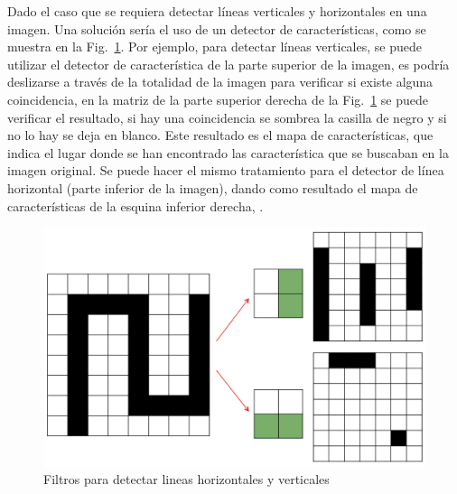    Dado el caso que se requiera detectar líneas verticales y horizontales en una imagen. Una solución sería el uso de un detector de características, como se muestra en la Fig.~\ref{fig:image_two_filter}. Por ejemplo, para detectar líneas verticales, se puede utilizar el detector de característica de la parte superior de la imagen, es podría deslizarse a través de la totalidad de la imagen para verificar si existe alguna coincidencia, en la matriz de la parte superior derecha de la Fig.~\ref{fig:image_two_filter} se puede verificar el resultado, si hay una coincidencia se sombrea la casilla de negro y si no lo hay se deja en blanco. Este resultado es el mapa de características, que indica el lugar donde se han encontrado las característica que se buscaban en la imagen original. Se puede hacer el mismo tratamiento para el detector de línea horizontal (parte inferior de la imagen), dando como resultado el mapa de características de la esquina inferior derecha, \cite{NIPS2010_0550, dlBook}.
    \begin{figure}[htp]
        \centering
        \includegraphics[scale=0.4]{chapter3/image_two_filter.png}
        \caption{Filtros para detectar lineas horizontales y verticales}
        \label{fig:image_two_filter}
    \end{figure}


